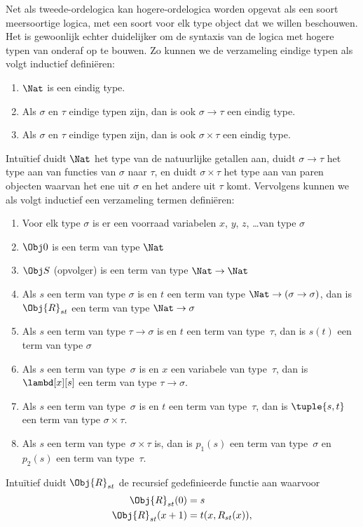 \documentclass[openany]{memoir}
\begin{document}
Net als tweede-ordelogica kan hogere-ordelogica worden opgevat als een soort
meersoortige logica, met een soort voor elk type object dat we willen
beschouwen. Het is gewoonlijk echter duidelijker om de syntaxis van de logica
met hogere typen van onderaf op te bouwen. Zo kunnen we de verzameling eindige
typen als volgt inductief definiëren:
\begin{enumerate}
\item $\Nat$ is een eindig type.
\item Als $\sigma$ en $\tau$ eindige typen zijn, dan is ook $\sigma
  \to \tau$ een eindig type.
\item Als $\sigma$ en $\tau$ eindige typen zijn, dan is ook $\sigma \times
  \tau$ een eindig type.
\end{enumerate}
Intuïtief duidt $\Nat$ het type van de natuurlijke getallen aan, duidt
$\sigma \to \tau$ het type aan van functies van $\sigma$ naar $\tau$, en
duidt $\sigma \times \tau$ het type aan van paren objecten waarvan het ene uit
$\sigma$ en het andere uit $\tau$ komt. Vervolgens kunnen we als volgt
inductief een verzameling termen definiëren:
\begin{enumerate}
\item Voor elk type $\sigma$ is er een voorraad variabelen $x$, $y$,
  $z$, \dots van type $\sigma$
\item $\Obj 0$ is een term van type $\Nat$
\item $\Obj S$ (opvolger) is een term van type $\Nat \to \Nat$
\item Als $s$ een term van type $\sigma$ is en $t$ een term van type
  $\Nat \to (\sigma \to \sigma)$, dan is $\Obj{R}_{st}$ een term van type
  $\Nat \to \sigma$
\item Als $s$ een term van type $\tau \to \sigma$ is en $t$ een
  term van type~$\tau$, dan is $s(t)$ een term van type $\sigma$
\item Als $s$ een term van type~$\sigma$ is en $x$ een variabele van
  type~$\tau$, dan is $\lambd[x][s]$ een term van type $\tau \to \sigma$.
\item Als $s$ een term van type~$\sigma$ is en $t$ een term van
  type~$\tau$, dan is $\tuple{s, t}$ een term van type $\sigma \times
  \tau$.
\item Als $s$ een term van type~$\sigma \times \tau$ is, dan is $p_1(s)$ een
  term van type~$\sigma$ en $p_2(s)$ een term van type~$\tau$.
\end{enumerate}
Intuïtief duidt $\Obj{R}_{st}$ de recursief gedefinieerde functie aan waarvoor
\begin{align*}
\Obj{R}_{st}(0) & = s \\
\Obj{R}_{st}(x+1) & = t(x, R_{st}(x)),
\end{align*}
\end{document}
